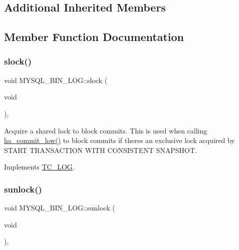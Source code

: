 \subsection*{Additional Inherited Members}


\subsection{Member Function Documentation}
\mbox{\label{classMYSQL__BIN__LOG_a189bd79b457e303f7c6ef936e3c932cf}} 
\subsubsection{\texorpdfstring{slock()}{slock()}}
{\footnotesize\ttfamily void M\+Y\+S\+Q\+L\+\_\+\+B\+I\+N\+\_\+\+L\+O\+G\+::slock (\begin{DoxyParamCaption}\item[{void}]{ }\end{DoxyParamCaption})\hspace{0.3cm}{\ttfamily [inline]}, {\ttfamily [virtual]}}

Acquire a shared lock to block commits. This is used when calling \mbox{\hyperlink{handler_8cc_a4a77fdd0e1d6bee79e29e7495c7d752a}{ha\+\_\+commit\+\_\+low()}} to block commits if there\textquotesingle{}s an exclusive lock acquired by S\+T\+A\+RT T\+R\+A\+N\+S\+A\+C\+T\+I\+ON W\+I\+TH C\+O\+N\+S\+I\+S\+T\+E\+NT S\+N\+A\+P\+S\+H\+OT. 

Implements \mbox{\hyperlink{classTC__LOG_a5b73af1ad12c691b3417c565f7e58a1c}{T\+C\+\_\+\+L\+OG}}.

\mbox{\label{classMYSQL__BIN__LOG_a594f819067f89619e7329f67043c1323}} 
\subsubsection{\texorpdfstring{sunlock()}{sunlock()}}
{\footnotesize\ttfamily void M\+Y\+S\+Q\+L\+\_\+\+B\+I\+N\+\_\+\+L\+O\+G\+::sunlock (\begin{DoxyParamCaption}\item[{void}]{ }\end{DoxyParamCaption})\hspace{0.3cm}{\ttfamily [inline]}, {\ttfamily [virtual]}}

